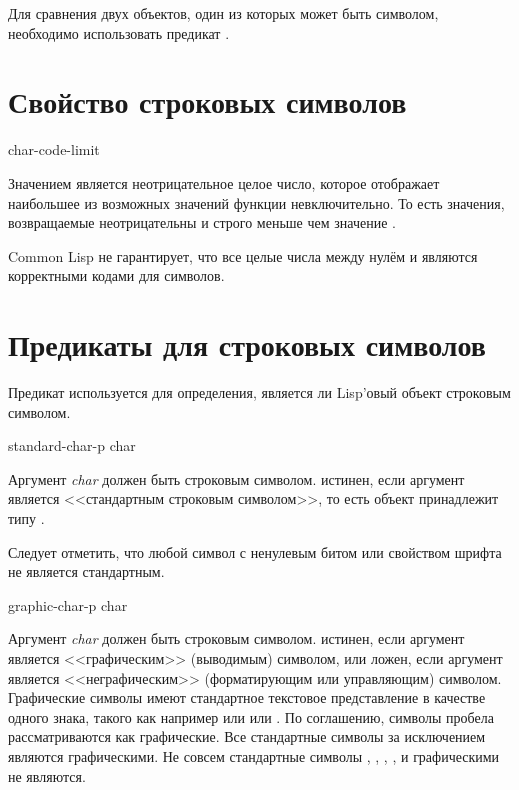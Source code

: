 Для сравнения двух объектов, один из которых может быть символом, необходимо
использовать предикат .

\section{Свойство строковых символов}

\begin{defun}[Константа]
char-code-limit

Значением  является неотрицательное целое число, которое
отображает наибольшее из возможных значений функции 
невключительно. То есть значения, возвращаемые  неотрицательны и
строго меньше чем значение .

Common Lisp не гарантирует, что все целые числа между нулём и
 являются корректными кодами для символов.
\end{defun}

\section{Предикаты для строковых символов}

Предикат  используется для определения, является ли
Lisp'овый объект строковым символом. 

\begin{defun}[Функция]
standard-char-p char

Аргумент \emph{char} должен быть строковым символом.
 истинен, если аргумент является <<стандартным строковым
символом>>, то есть объект принадлежит типу .

Следует отметить, что любой символ с ненулевым битом или свойством шрифта не
является стандартным.
\end{defun}

\begin{defun}[Функция]
graphic-char-p char

Аргумент \emph{char} должен быть строковым символом.
 истинен, если аргумент является <<графическим>> (выводимым)
символом, или ложен, если аргумент является <<неграфическим>> (форматирующим или
управляющим) символом. Графические символы имеют стандартное текстовое
представление в качестве одного знака, такого как например  или \cdf{*}
или \cdf{=}.
По соглашению, символы пробела рассматриваются как графические.
Все стандартные символы за исключением  являются
графическими.
Не совсем стандартные символы
, ,
, ,
 и   графическими не являются.
\end{defun}

